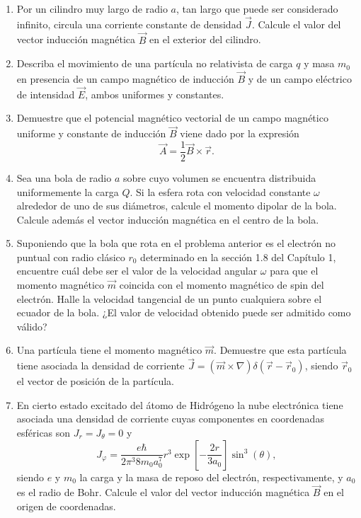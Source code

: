 \documentclass[12pt,a4paper]{book}
\begin{document}
\begin{enumerate}
\item Por un cilindro muy largo de radio $a$, tan largo que puede ser considerado infinito, circula una corriente constante de densidad $\vec{J}$. Calcule el valor del vector inducción magnética $\vec{B}$ en el exterior del cilindro.

\item Describa el movimiento de una partícula no relativista de carga $q$ y masa $m_0$ en presencia de un campo magnético de inducción $\vec{B}$ y de un campo eléctrico de intensidad $\vec{E}$, ambos uniformes y constantes.

\item Demuestre que el potencial magnético vectorial de un campo magnético uniforme y constante de inducción $\vec{B}$ viene dado por la expresión
\begin{equation*}
\vec{A} = \frac{1}{2}\vec{B} \times \vec{r}.
\end{equation*}

\item Sea una bola de radio $a$ sobre cuyo volumen se encuentra distribuida uniformemente la carga $Q$. Si la esfera rota con velocidad constante $\omega$ alrededor de uno de sus diámetros, calcule el momento dipolar de la bola. Calcule además el vector inducción magnética en el centro de la bola.

\item Suponiendo que la bola que rota en el problema anterior es el electrón no puntual con radio clásico $r_0$ determinado en la sección 1.8 del Capítulo 1, encuentre cuál debe ser el valor de la velocidad angular $\omega$ para que el momento magnético $\vec{m}$ coincida con el momento magnético de spin del electrón. Halle la velocidad tangencial de un punto cualquiera sobre el ecuador de la bola. ¿El valor de velocidad obtenido puede ser admitido como válido?

\item Una partícula tiene el momento magnético $\vec{m}$. Demuestre que esta partícula tiene asociada la densidad de corriente $\vec{J} = (\vec{m} \times \nabla)\delta(\vec{r} - \vec{r}_0)$, siendo $\vec{r}_0$ el vector de posición de la partícula.

\item En cierto estado excitado del átomo de Hidrógeno la nube electrónica tiene asociada una densidad de corriente cuyas componentes en coordenadas esféricas son $J_r = J_\theta = 0$ y
\begin{equation*}
J_\varphi = \frac{e\hbar}{2\pi^3 8m_0 a_0^7}r^3\exp\left[-\frac{2r}{3a_0}\right]\sin^3(\theta),
\end{equation*}
siendo $e$ y $m_0$ la carga y la masa de reposo del electrón, respectivamente, y $a_0$ es el radio de Bohr. Calcule el valor del vector inducción magnética $\vec{B}$ en el origen de coordenadas.


\end{enumerate}
\end{document}
